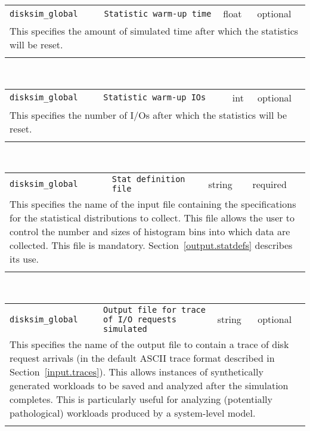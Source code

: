 \noindent 
\begin{tabular}{|p{\lpmodwidth}|p{\lpnamewidth}|p{0.5in}|p{0.5in}|}
\cline{1-4}
\texttt{disksim\_global} & \texttt{Statistic warm-up time} & float & optional \\ 
\cline{1-4}
\multicolumn{4}{|p{6in}|}{
This specifies the amount of simulated time after which the statistics
will be reset.
}\\ 
\cline{1-4}
\multicolumn{4}{p{5in}}{}\\
\end{tabular}\\ 
\noindent 
\begin{tabular}{|p{\lpmodwidth}|p{\lpnamewidth}|p{0.5in}|p{0.5in}|}
\cline{1-4}
\texttt{disksim\_global} & \texttt{Statistic warm-up IOs} & int & optional \\ 
\cline{1-4}
\multicolumn{4}{|p{6in}|}{
This specifies the number of I/Os after which the statistics will be reset.
}\\ 
\cline{1-4}
\multicolumn{4}{p{5in}}{}\\
\end{tabular}\\ 
\noindent 
\begin{tabular}{|p{\lpmodwidth}|p{\lpnamewidth}|p{0.5in}|p{0.5in}|}
\cline{1-4}
\texttt{disksim\_global} & \texttt{Stat definition file} & string & required \\ 
\cline{1-4}
\multicolumn{4}{|p{6in}|}{
This specifies the name of the input file containing the
specifications for the statistical distributions to collect. This
file allows the user to control the number and sizes of histogram bins
into which data are collected. This file is mandatory.
Section~\ref{output.statdefs} describes its use.
}\\ 
\cline{1-4}
\multicolumn{4}{p{5in}}{}\\
\end{tabular}\\ 
\noindent 
\begin{tabular}{|p{\lpmodwidth}|p{\lpnamewidth}|p{0.5in}|p{0.5in}|}
\cline{1-4}
\texttt{disksim\_global} & \texttt{Output file for trace of I/O requests simulated} & string & optional \\ 
\cline{1-4}
\multicolumn{4}{|p{6in}|}{
This specifies the name of the output file to contain a trace of disk
request arrivals (in the default ASCII trace format described in
Section~\ref{input.traces}). This allows instances of synthetically
generated workloads to be saved and analyzed after the simulation
completes. This is particularly useful for analyzing (potentially
pathological) workloads produced by a system-level model.
}\\ 
\cline{1-4}
\multicolumn{4}{p{5in}}{}\\
\end{tabular}\\ 

